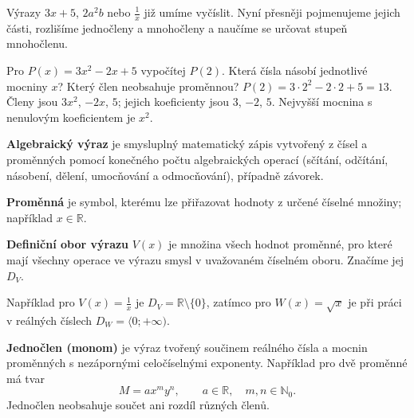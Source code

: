 \documentclass[11pt,a4paper]{article}
\begin{document}

Výrazy $3x+5$, $2a^2b$ nebo $\frac1x$ již umíme vyčíslit. Nyní přesněji pojmenujeme jejich části, rozlišíme jednočleny a mnohočleny a naučíme se určovat stupeň mnohočlenu.

\begin{prikladReseniBox}[title={Příklad 1},breakable=false]
Pro $P(x)=3x^2-2x+5$ vypočítej $P(2)$. Která čísla násobí jednotlivé mocniny $x$? Který člen neobsahuje proměnnou?
\tcblower
$P(2)=3\cdot 2^2-2\cdot 2+5=13$. Členy jsou $3x^2$, $-2x$, $5$; jejich koeficienty jsou $3$, $-2$, $5$. Nejvyšší mocnina s nenulovým koeficientem je $x^2$.
\end{prikladReseniBox}



\begin{definiceBox}[title={Definice - Algebraický výraz}]
\textbf{Algebraický výraz} je smysluplný matematický zápis vytvořený z čísel a proměnných pomocí konečného počtu algebraických operací (sčítání, odčítání, násobení, dělení, umocňování a odmocňování), případně závorek.
\end{definiceBox}

\begin{definiceBox}[title={Definice - Proměnná}]
\textbf{Proměnná} je symbol, kterému lze přiřazovat hodnoty z určené číselné množiny; například $x\in\mathbb R$.
\end{definiceBox}

\begin{definiceBox}[title={Definice - Definiční obor výrazu}]
\textbf{Definiční obor výrazu} $V(x)$ je množina všech hodnot proměnné, pro které mají všechny operace ve výrazu smysl v uvažovaném číselném oboru. Značíme jej $D_V$.
\end{definiceBox}

Například pro $V(x)=\frac1x$ je $D_V=\mathbb R\setminus\{0\}$, zatímco pro $W(x)=\sqrt{x}$ je při práci v reálných číslech $D_W=\langle 0;+\infty)$.

\begin{definiceBox}[title={Definice - Jednočlen}]
\textbf{Jednočlen (monom)} je výraz tvořený součinem reálného čísla a mocnin proměnných s nezápornými celočíselnými exponenty. Například pro dvě proměnné má tvar
\[
M=ax^m y^n,\qquad a\in\mathbb R,\quad m,n\in\mathbb N_0.
\]
Jednočlen neobsahuje součet ani rozdíl různých členů.
\end{definiceBox}
\end{document}
